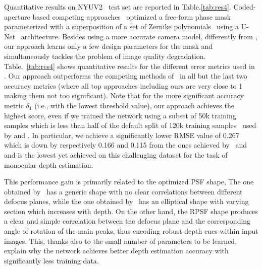 \documentclass[preprint,5p,twocolumn]{elsarticle}
\begin{document}
Quantitative results on NYUV2~\cite{eigen2015predicting} test set are reported in Table.\ref{tab:res4}. 
Coded-aperture based competing approaches~\cite{chang2019deep,wu2019phasecam3d} optimized a free-form phase mask parameterized with a superposition of a set of Zernike polynomials~\cite{iskander2001optimal,born2013principles} using a  U-Net~\cite{ronneberger2015u} architecture. Besides using a more accurate camera model, differently from \cite{chang2019deep,wu2019phasecam3d}, our approach learns only a few design parameters for the mask and simultaneously tackles the problem of image quality degradation.
Table.~\ref{tab:res4} shows quantitative results for the different error metrics used in \cite{eigen2014depth}. Our approach outperforms the competing methods of~\cite{chang2019deep,wu2019phasecam3d} in all but the last two accuracy metrics (where all top approaches including ours are very close to 1 making them not too significant). 
Note that for the more significant accuracy metric $\delta_{1}$ (i.e., with the lowest threshold value), our approach achieves the highest score, even if we trained the network using a subset of 50k training samples which is less than half of the default split of 120k training samples~\cite{eigen2014depth} used by \cite{chang2019deep} and \cite{wu2019phasecam3d}. In particular, we achieve a significantly lower RMSE value of 0.267 which is down by respectively 0.166 and 0.115 from the ones achieved by~\cite{chang2019deep} and~\cite{wu2019phasecam3d} and is the lowest yet achieved on this challenging dataset for the task of monocular depth estimation.

This performance gain is primarily related to the optimized PSF shape, The one obtained by~\cite{wu2019phasecam3d} has a generic shape with no clear correlations between different defocus planes, while the one obtained by~\cite{chang2019deep} has an elliptical shape with varying section which increases with depth. On the other hand, the RPSF shape produces a clear and simple correlation between the defocus plane and the corresponding angle of rotation of the main peaks, thus encoding robust depth cues within input images. This, thanks also to the small number of parameters to be learned, explain why the network achieves better depth estimation accuracy with significantly less training data.
\end{document}
